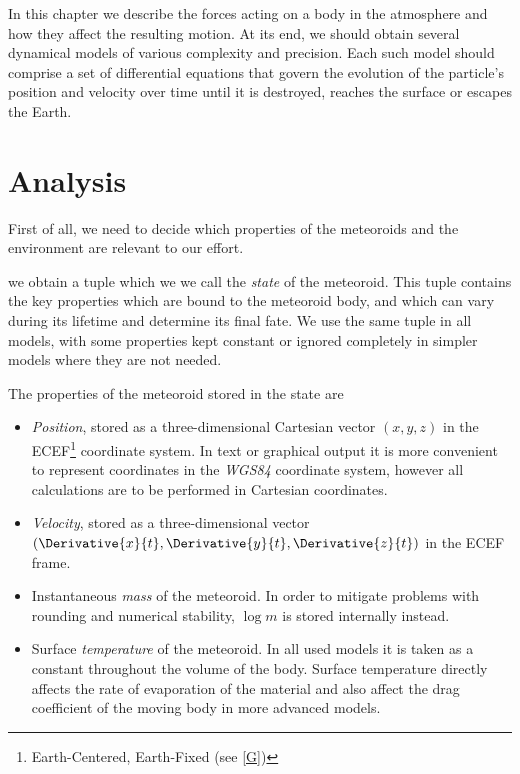 
In this chapter we describe the forces acting on a body in the atmosphere and how they affect the resulting motion.
At its end, we should obtain several dynamical models of various complexity and precision.
Each such model should comprise a set of differential equations that govern the evolution
of the particle's position and velocity over time until it is destroyed, reaches the surface
or escapes the Earth.

\section{Analysis} \label{da}
    First of all, we need to decide which properties of the meteoroids
    and the environment are relevant to our effort.



    we obtain a tuple which we we call the \emph{state} of the meteoroid.
    This tuple contains the key properties which are bound to the meteoroid body,
    and which can vary during its lifetime and determine its final fate.
    We use the same tuple in all models, with some properties
    kept constant or ignored completely in simpler models where they are not needed.

    The properties of the meteoroid stored in the state are
    \begin{itemize}
        \item \emph{Position}, stored as a three-dimensional Cartesian vector $(x, y, z)$
            in the ECEF\footnote{Earth-Centered, Earth-Fixed (see \cref{G})} coordinate system.
            In text or graphical output it is more convenient to represent
            coordinates in the \emph{WGS84} coordinate system, however
            all calculations are to be performed in Cartesian coordinates.
        \item \emph{Velocity}, stored as a three-dimensional vector
            $(\Derivative{x}{t}, \Derivative{y}{t}, \Derivative{z}{t})$
            in the ECEF frame.
        \item Instantaneous \emph{mass} of the meteoroid. In order to mitigate
            problems with rounding and numerical stability, $\log m$ is stored internally instead.
        \item Surface \emph{temperature} of the meteoroid. In all used models
            it is taken as a constant throughout the volume of the body.
            Surface temperature directly affects the rate of evaporation of the material
            and also affect the drag coefficient of the moving body in more advanced models.
    \end{itemize}

